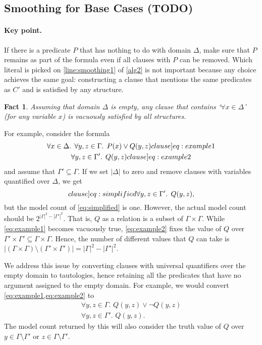 \documentclass{article}
\newtheorem{fact}{Fact}
\theoremstyle{definition}
\begin{document}
\subsection{Smoothing for Base Cases (TODO)}\label{sec:smoothingbase}


\paragraph{Key point.}
If there is a predicate $P$ that has nothing to do with domain $\Delta$, make
sure that $P$ remains as part of the formula even if all clauses with $P$ can be
removed. Which literal is picked on \cref{line:smoothing1} of \cref{alg2} is not
important because any choice achieves the same goal: constructing a clause that
mentions the same predicates as $C'$ and is satisfied by any structure.

\begin{fact}
  Assuming that domain $\Delta$ is empty, any clause that contains
  `$\forall x \in \Delta$' (for any variable $x$) is vacuously satisfied by all
  structures.
\end{fact}

For example, consider the formula
\begin{gather}
  \forall x \in \Delta\text{. }\forall y, z \in \Gamma\text{. }P(x) \lor Q(y, z)\label[clause]{eq:example1}\\
  \forall y, z \in \Gamma'\text{. }Q(y, z)\label[clause]{eq:example2}
\end{gather}
and assume that $\Gamma' \subseteq \Gamma$. If we set $|\Delta|$
to zero and remove clauses with variables quantified over $\Delta$, we get
\begin{equation}\label[clause]{eq:simplified}
  \forall y, z \in \Gamma'\text{. }Q(y, z),
\end{equation}
but the model count of \cref{eq:simplified} is one. However, the actual model
count should be $2^{|\Gamma|^2 - |\Gamma'|^2}$. That is, $Q$ as a relation is a
subset of $\Gamma \times \Gamma$. While \cref{eq:example1} becomes vacuously
true, \cref{eq:example2} fixes the value of $Q$ over
$\Gamma' \times \Gamma' \subseteq \Gamma \times \Gamma$. Hence, the number of
different values that $Q$ can take is
$|(\Gamma \times \Gamma) \setminus (\Gamma' \times \Gamma')| = |\Gamma|^{2} - |\Gamma'|^{2}$.

We address this issue by converting clauses with universal quantifiers over the
empty domain to tautologies, hence retaining all the predicates that have no
argument assigned to the empty domain. For example, we would convert
\cref{eq:example1,eq:example2} to
\begin{gather*}
  \forall y, z \in \Gamma\text{. }Q(y, z) \lor \neg Q(y, z)\\
  \forall y, z \in \Gamma'\text{. }Q(y, z).
\end{gather*}
The model count returned by this will also consider the truth value of $Q$ over
$y \in \Gamma \setminus \Gamma'$ or $z \in \Gamma \setminus \Gamma'$.
\end{document}
